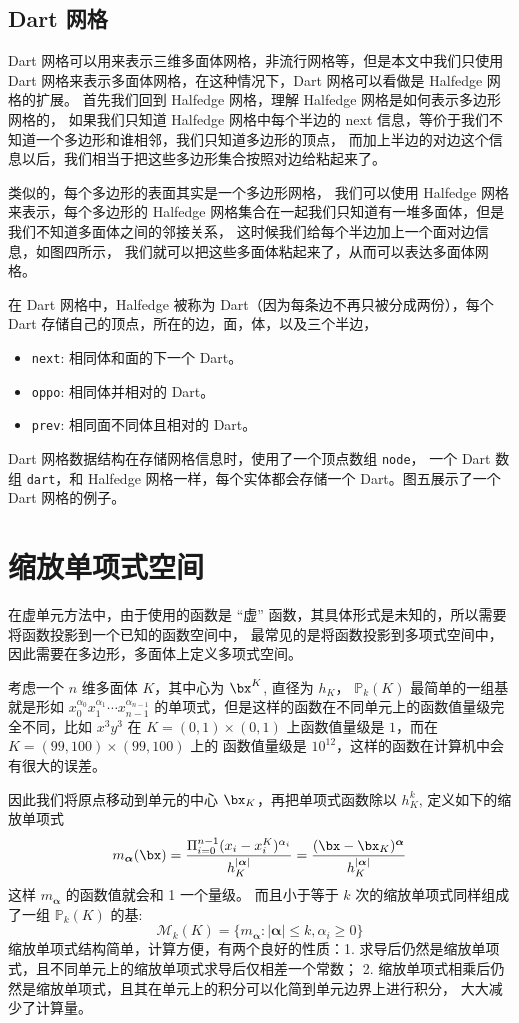 \subsection{Dart 网格}
Dart 网格可以用来表示三维多面体网格，非流行网格等，但是本文中我们只使用 Dart
网格来表示多面体网格，在这种情况下，Dart 网格可以看做是 Halfedge
网格的扩展。
首先我们回到 Halfedge 网格，理解 Halfedge 网格是如何表示多边形网格的，
如果我们只知道 Halfedge 网格中每个半边的 next 
信息，等价于我们不知道一个多边形和谁相邻，我们只知道多边形的顶点，
而加上半边的对边这个信息以后，我们相当于把这些多边形集合按照对边给粘起来了。

类似的，每个多边形的表面其实是一个多边形网格，
我们可以使用 Halfedge 网格来表示，每个多边形的 Halfedge
网格集合在一起我们只知道有一堆多面体，但是我们不知道多面体之间的邻接关系，
这时候我们给每个半边加上一个面对边信息，如图四所示，
我们就可以把这些多面体粘起来了，从而可以表达多面体网格。

在 Dart 网格中，Halfedge 被称为 Dart（因为每条边不再只被分成两份），每个 Dart
存储自己的顶点，所在的边，面，体，以及三个半边，
\begin{itemize}
    \item \lstinline{next}: 相同体和面的下一个 Dart。
    \item \lstinline{oppo}: 相同体并相对的 Dart。
    \item \lstinline{prev}: 相同面不同体且相对的 Dart。
\end{itemize}
Dart 网格数据结构在存储网格信息时，使用了一个顶点数组 \lstinline{node}，
一个 Dart 数组 \lstinline{dart}，和 Halfedge 网格一样，每个实体都会存储一个
Dart。图五展示了一个 Dart 网格的例子。

\section{缩放单项式空间}
在虚单元方法中，由于使用的函数是 ``虚''
函数，其具体形式是未知的，所以需要将函数投影到一个已知的函数空间中，
最常见的是将函数投影到多项式空间中，因此需要在多边形，多面体上定义多项式空间。

考虑一个 $n$ 维多面体 $K$，其中心为 $\bx^K$, 直径为 $h_K$，
$\mathbb{P}_k(K)$ 
最简单的一组基就是形如 $x_0^{\alpha_0}x_1^{\alpha_1}\cdots x_{n-1}^{\alpha_{n-1}}$ 
的单项式，但是这样的函数在不同单元上的函数值量级完全不同，比如 $x^3y^3$ 在
$K = (0, 1)\times(0, 1)$ 上函数值量级是 $1$，而在 $K = (99, 100)\times(99, 100)$ 上的
函数值量级是 $10^{12}$，这样的函数在计算机中会有很大的误差。

因此我们将原点移动到单元的中心 $\bx_K$，再把单项式函数除以 $h^k_K$, 
定义如下的缩放单项式
$$
m_{\boldsymbol{\alpha}}(\bx) = 
\frac{\Pi_{i=0}^{n-1} (x_i-x_i^K)^{\alpha_i}}{h^{|\boldsymbol{\alpha}|}_K}
= \frac{(\bx-\bx_K)
^{\boldsymbol{\alpha}}}{h^{|\boldsymbol{\alpha}|}_K}
$$
这样 $m_{\boldsymbol{\alpha}}$ 的函数值就会和 1 一个量级。
而且小于等于 $k$ 次的缩放单项式同样组成了一组 $\mathbb{P}_k(K)$ 的基:
$$
\mathcal{M}_k(K) = \{m_{\boldsymbol{\alpha}}: |\boldsymbol{\alpha}| \le k,
    \alpha_i \ge 0\}
$$
缩放单项式结构简单，计算方便，有两个良好的性质：1.
求导后仍然是缩放单项式，且不同单元上的缩放单项式求导后仅相差一个常数；
2.
缩放单项式相乘后仍然是缩放单项式，且其在单元上的积分可以化简到单元边界上进行积分，
大大减少了计算量。

